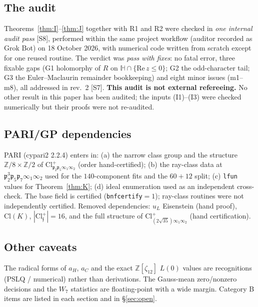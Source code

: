 \documentclass[11pt]{article}
\theoremstyle{definition}
\newcommand{\Z}{\mathbb{Z}}
\newcommand{\Hb}{\mathbb{H}}
\newcommand{\fp}{\mathfrak{p}}
\newcommand{\ff}{\mathfrak{f}}
\newcommand{\src}[1]{\textup{[S#1]}}
\begin{document}
\subsection{The audit}\label{sec:audit}
Theorems~\ref{thm:I}--\ref{thm:J} together with R1 and R2 were checked in \emph{one internal audit pass} \src{8}, performed within the same project
workflow (auditor recorded as Grok Bot) on 18 October 2026, with numerical code written from scratch except for one reused routine. The verdict was
\emph{pass with fixes}: no fatal error, three fixable gaps (G1 holomorphy of $R$ on $\Hb\cap\{\mathrm{Re}\,z\le0\}$; G2 the odd-character tail; G3
the Euler--Maclaurin remainder bookkeeping) and eight minor issues (m1--m8), all addressed in rev.~2 \src{7}. \textbf{This audit is not external
refereeing.} No other result in this paper has been audited; the inputs (I1)--(I3) were checked numerically but their proofs were not re-audited.

\subsection{PARI/GP dependencies}
PARI (cypari2 2.2.4) enters in: (a) the narrow class group and the structure $\Z/8\times\Z/2$ of $\mathrm{Cl}^+_{\fp_2\fp_5\infty_1\infty_2}$ (order hand-certified);
(b) the ray-class data at $\fp_2^3\fp_5\fp_7\infty_1\infty_2$ used for the $140$-component fits and the $60+12$ split; (c) \texttt{lfun} values for
Theorem~\ref{thm:K}; (d) ideal enumeration used as an independent cross-check. The base field is certified (\texttt{bnfcertify}$=1$); ray-class routines
were not independently certified. Removed dependencies: $u_L$ Eisenstein (hand proof), $\mathrm{Cl}(K)$, $|\mathrm{Cl}^+_\ff|=16$, and the full structure of
$\mathrm{Cl}^+_{(2\sqrt{35})\infty_1\infty_2}$ (hand certification).

\subsection{Other caveats}
The radical forms of $a_H$, $a_C$ and the exact $\Z[\zeta_{12}]$ $L(0)$ values are recognitions (PSLQ / numerical) rather than derivations. The Gauss-mean
zero/nonzero decisions and the $W_7$ statistics are floating-point with a wide margin. Category B items are listed in each section and in
\S\ref{sec:open}.
\end{document}
